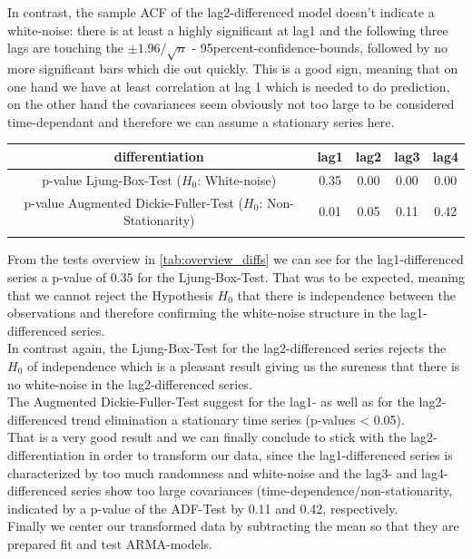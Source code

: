 \documentclass[11pt,a4paper]{article}
\begin{document}
In contrast, the sample ACF of the lag2-differenced model doesn't indicate a white-noise: there is at least a highly significant at lag1 and the following three lags are touching the $\pm 1.96 / \sqrt{n}$ - 95percent-confidence-bounds, followed by no more significant bars which die out quickly.
This is a good sign, meaning that on one hand we have at least correlation at lag 1 which is needed to do prediction, on the other hand the covariances seem obviously not too large to be considered time-dependant and therefore we can assume a stationary series here.

\begin{center}
\begin{tabular}{c|cccc}
    differentiation  & lag1 & lag2 & lag3 & lag4 \\
    \hline 
    \makecell{p-value Ljung-Box-Test\\($H_0$: White-noise)} & 0.35 & 0.00 & 0.00 & 0.00\\
    \makecell{p-value Augmented Dickie-Fuller-Test\\($H_0$: Non-Stationarity)} & 0.01 & 0.05 & 0.11 & 0.42\\
    \label{tab:overview_diffs}
\end{tabular}
\end{center}

From the tests overview in \cref{tab:overview_diffs} we can see for the lag1-differenced series a p-value of 0.35 for the Ljung-Box-Test.
That was to be expected, meaning that we cannot reject the Hypothesis $H_0$ that there is independence between the observations \citep{LjungBox78} and therefore confirming the white-noise structure in the lag1-differenced series. \\
In contrast again, the Ljung-Box-Test for the lag2-differenced series rejects the $H_0$ of independence which is a pleasant result giving us the sureness that there is no white-noise in the lag2-differenced series.\\
The Augmented Dickie-Fuller-Test suggest for the lag1- as well as for the lag2-differenced trend elimination a stationary time series (p-values < 0.05).\\
That is a very good result and we can finally conclude to stick with the lag2-differentiation in order to transform our data, since the lag1-differenced series is characterized by too much randomness and white-noise and the lag3- and lag4-differenced series show too large covariances (time-dependence/non-stationarity, indicated by a p-value of the ADF-Test by 0.11 and 0.42, respectively.\\
Finally we center our transformed data by subtracting the mean so that they are prepared fit and test ARMA-models.
\end{document}
